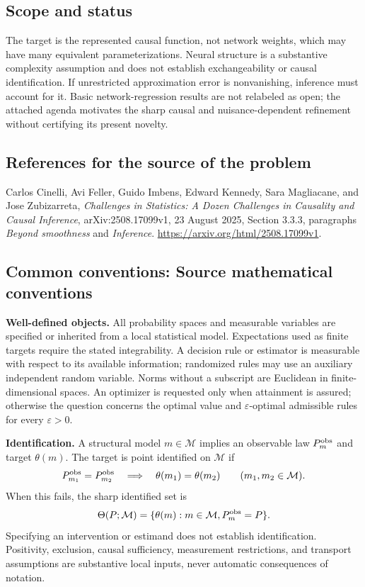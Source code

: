 \documentclass[11pt,a4paper]{article}
\begin{document}
\subsection*{Scope and status}
The target is the represented causal function, not network weights, which may have many equivalent parameterizations. Neural structure is a substantive complexity assumption and does not establish exchangeability or causal identification. If unrestricted approximation error is nonvanishing, inference must account for it. Basic network-regression results are not relabeled as open; the attached agenda motivates the sharp causal and nuisance-dependent refinement without certifying its present novelty.
\subsection*{References for the source of the problem}
Carlos Cinelli, Avi Feller, Guido Imbens, Edward Kennedy, Sara Magliacane, and Jose Zubizarreta, \emph{Challenges in Statistics: A Dozen Challenges in Causality and Causal Inference}, arXiv:2508.17099v1, 23 August 2025, Section 3.3.3, paragraphs \emph{Beyond smoothness} and \emph{Inference}. \url{https://arxiv.org/html/2508.17099v1}.

\subsection*{Common conventions: Source mathematical conventions}

\textbf{Well-defined objects.}
All probability spaces and measurable variables are specified or inherited
from a local statistical model. Expectations used as finite targets require
the stated integrability. A decision rule or estimator is measurable with
respect to its available information; randomized rules may use an auxiliary
independent random variable. Norms without a subscript are Euclidean in
finite-dimensional spaces. An optimizer is requested only when attainment
is assured; otherwise the question concerns the optimal value and
$\varepsilon$-optimal admissible rules for every $\varepsilon>0$.

\textbf{Identification.}
A structural model $m\in\mathcal M$ implies an observable law
$P_m^{\rm obs}$ and target $\theta(m)$. The target is point identified on
$\mathcal M$ if
\[
 P_{m_1}^{\rm obs}=P_{m_2}^{\rm obs}
 \quad\Longrightarrow\quad\theta(m_1)=\theta(m_2)
 \qquad(m_1,m_2\in\mathcal M).
\]
When this fails, the sharp identified set is
\[
 \Theta(P;\mathcal M)=\{\theta(m):m\in\mathcal M,
                                  P_m^{\rm obs}=P\}.
\]
Specifying an intervention or estimand does not establish identification.
Positivity, exclusion, causal sufficiency, measurement restrictions, and
transport assumptions are substantive local inputs, never automatic
consequences of notation.
\end{document}
